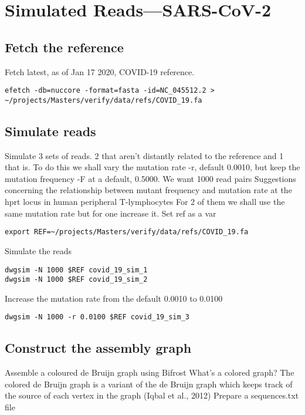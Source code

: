 \documentclass[11pt]{article}
\author{Njagi Mwaniki}
\date{\today}
\title{}
\begin{document}
\tableofcontents

\section{Simulated Reads—SARS-CoV-2}
\label{sec:orgf056e3e}
\subsection{Fetch the reference}
\label{sec:org897351d}
Fetch latest, as of Jan 17 2020, COVID-19 reference.

\begin{verbatim}
efetch -db=nuccore -format=fasta -id=NC_045512.2 > ~/projects/Masters/verify/data/refs/COVID_19.fa
\end{verbatim}

\subsection{Simulate reads}
\label{sec:org122c97f}
Simulate 3 sets of reads. 2 that aren’t distantly related to the reference and 1 that is.
To do this we shall vary the mutation rate -r, default 0.0010, but keep the mutation frequency -F at a default, 0.5000. We want 1000 read pairs
Suggestions concerning the relationship between mutant frequency and mutation rate at the hprt locus in human peripheral T-lymphocytes
For 2 of them we shall use the same mutation rate but for one increase it.
Set ref as a var


\begin{verbatim}
export REF=~/projects/Masters/verify/data/refs/COVID_19.fa
\end{verbatim}

Simulate the reads
\begin{verbatim}
dwgsim -N 1000 $REF covid_19_sim_1
dwgsim -N 1000 $REF covid_19_sim_2
\end{verbatim}

Increase the mutation rate from the default 0.0010 to 0.0100

\begin{verbatim}
dwgsim -N 1000 -r 0.0100 $REF covid_19_sim_3
\end{verbatim}

\subsection{Construct the assembly graph}
\label{sec:org776bad2}
Assemble a coloured de Bruijn graph using Bifrost
What’s a colored graph? The colored de Bruijn graph is a variant of the de Bruijn graph which keeps track of the source of each vertex in the graph (Iqbal et al., 2012)
Prepare a sequences.txt file
\end{document}
